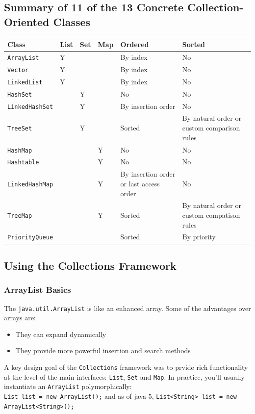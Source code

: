 \subsection{Summary of 11 of the 13 Concrete Collection-Oriented Classes}
\begin{center}
\begin{tabular}{llllp{4cm}p{4cm}}
    \textbf{Class} & \textbf{List} & \textbf{Set} & \textbf{Map} & 
    \textbf{Ordered} & \textbf{Sorted} \\
    \hline
    \verb#ArrayList# & Y & & & By index & No \\
    \verb#Vector# & Y & & & By index & No \\
    \verb#LinkedList# & Y & & & By index & No \\
    \hline
    \verb#HashSet# & & Y & & No & No \\
    \verb#LinkedHashSet# & & Y & & By insertion order & No \\
    \verb#TreeSet# & & Y & & Sorted & By natural order or custom comparison 
    rules \\
    \hline
    \verb#HashMap# & & & Y & No & No \\
    \verb#Hashtable# & & & Y & No & No \\
    \verb#LinkedHashMap# & & & Y & By insertion order or last access order & No 
    \\
    \verb#TreeMap# & & & Y & Sorted & By natural order or custom compatison 
    rules \\
    \hline
    \verb#PriorityQueue# & & & & Sorted & By priority \\
\end{tabular}
\end{center}

\subsection{Using the Collections Framework}
\subsubsection{ArrayList Basics}
The \verb#java.util.ArrayList# is like an enhanced array. Some of the 
advantages over arrays are:
\begin{itemize}
    \item They can expand dynamically
    \item They provide more powerful insertion and search methods
\end{itemize}
A key design goal of the \verb#Collections# framework was to prvide rich 
functionality at the level of the main interfaces: \verb#List#, \verb#Set# and 
\verb#Map#. In practice, you'll usually instantiate an \verb#ArrayList# 
polymorphically:\\
\verb#List list = new ArrayList();# and as of java 5,
\verb#List<String> list = new ArrayList<String>();#

